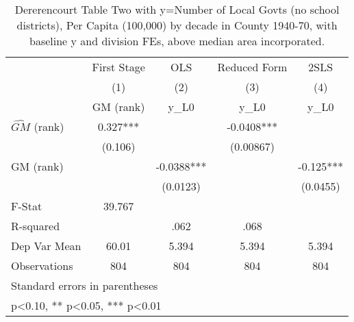 \begin{table}[htbp]\centering
\def\sym#1{\ifmmode^{#1}\else\(^{#1}\)\fi}
\caption{Dererencourt Table Two with y=Number of Local Govts (no school districts), Per Capita (100,000) by decade in County 1940-70, with baseline y and division FEs, above median area incorporated.}
\begin{tabular}{l*{4}{c}}
\toprule
                    & First Stage   &         OLS   &Reduced Form   &        2SLS   \\
                    &\multicolumn{1}{c}{(1)}&\multicolumn{1}{c}{(2)}&\multicolumn{1}{c}{(3)}&\multicolumn{1}{c}{(4)}\\
                    &\multicolumn{1}{c}{GM  (rank)}&\multicolumn{1}{c}{y\_L0}&\multicolumn{1}{c}{y\_L0}&\multicolumn{1}{c}{y\_L0}\\
\midrule
$\hat{GM}$ (rank)   &       0.327***&               &     -0.0408***&               \\
                    &     (0.106)   &               &   (0.00867)   &               \\
\addlinespace
GM  (rank)          &               &     -0.0388***&               &      -0.125***\\
                    &               &    (0.0123)   &               &    (0.0455)   \\
\midrule
F-Stat              &      39.767   &               &               &               \\
R-squared           &               &        .062   &        .068   &               \\
Dep Var Mean        &       60.01   &       5.394   &       5.394   &       5.394   \\
Observations        &         804   &         804   &         804   &         804   \\
\bottomrule
\multicolumn{5}{l}{\footnotesize Standard errors in parentheses}\\
\multicolumn{5}{l}{\footnotesize * p<0.10, ** p<0.05, *** p<0.01}\\
\end{tabular}
\end{table}
